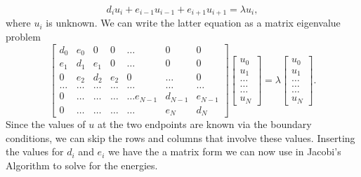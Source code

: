 \documentclass{article}
\begin{document}
\begin{equation*}
d_iu_i+e_{i-1}u_{i-1}+e_{i+1}u_{i+1}  = \lambda u_i,
\end{equation*}
where $u_i$ is unknown. We can write the 
latter equation as a matrix eigenvalue problem
\begin{equation}
    \begin{bmatrix}d_0 & e_0 & 0   & 0    & \dots  &0     & 0 \\
                                e_1 & d_1 & e_1 & 0    & \dots  &0     &0 \\
                                0   & e_2 & d_2 & e_2  &0       &\dots & 0\\
                                \dots  & \dots & \dots & \dots  &\dots      &\dots & \dots\\
                                0   & \dots & \dots & \dots  &\dots  e_{N-1}     &d_{N-1} & e_{N-1}\\
                                0   & \dots & \dots & \dots  &\dots       &e_{N} & d_{N}
             \end{bmatrix}  \begin{bmatrix} u_{0} \\
                                                              u_{1} \\
                                                              \dots\\ \dots\\ \dots\\
                                                              u_{N}
             \end{bmatrix}=\lambda \begin{bmatrix} u_{0} \\
                                                              u_{1} \\
                                                              \dots\\ \dots\\ \dots\\
                                                              u_{N}
             \end{bmatrix}.  
      \label{eq:sematrix}
\end{equation}
Since the values of $u$ at the two endpoints are known via the boundary conditions, we can skip the rows and columns that involve these values. Inserting the values for $d_i$ and $e_i$ we have the a matrix form we can now use in Jacobi's Algorithm to solve for the energies. \cite{mortengithub}
\end{document}
